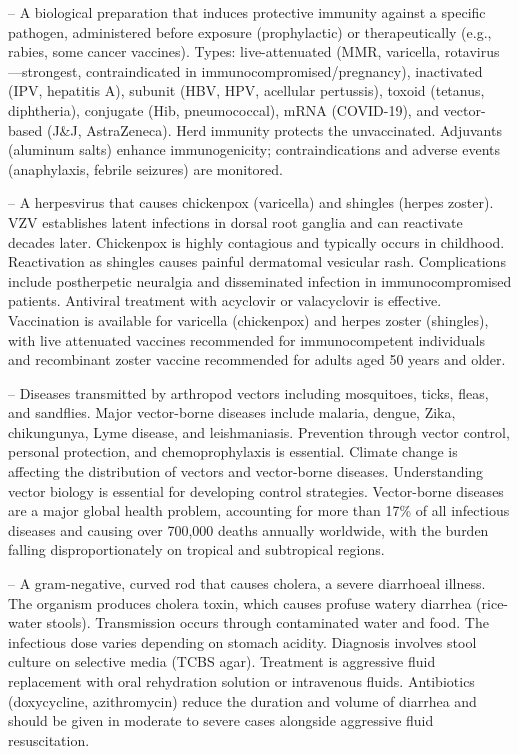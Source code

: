 -- A biological preparation that induces protective immunity against a specific pathogen, administered before exposure (prophylactic) or therapeutically (e.g., rabies, some cancer vaccines). Types: live-attenuated (MMR, varicella, rotavirus—strongest, contraindicated in immunocompromised/pregnancy), inactivated (IPV, hepatitis A), subunit (HBV, HPV, acellular pertussis), toxoid (tetanus, diphtheria), conjugate (Hib, pneumococcal), mRNA (COVID-19), and vector-based (J\&J, AstraZeneca). Herd immunity protects the unvaccinated. Adjuvants (aluminum salts) enhance immunogenicity; contraindications and adverse events (anaphylaxis, febrile seizures) are monitored.

-- A herpesvirus that causes chickenpox (varicella) and shingles (herpes zoster). VZV establishes latent infections in dorsal root ganglia and can reactivate decades later. Chickenpox is highly contagious and typically occurs in childhood. Reactivation as shingles causes painful dermatomal vesicular rash. Complications include postherpetic neuralgia and disseminated infection in immunocompromised patients. Antiviral treatment with acyclovir or valacyclovir is effective. Vaccination is available for varicella (chickenpox) and herpes zoster (shingles), with live attenuated vaccines recommended for immunocompetent individuals and recombinant zoster vaccine recommended for adults aged 50 years and older.

-- Diseases transmitted by arthropod vectors including mosquitoes, ticks, fleas, and sandflies. Major vector-borne diseases include malaria, dengue, Zika, chikungunya, Lyme disease, and leishmaniasis. Prevention through vector control, personal protection, and chemoprophylaxis is essential. Climate change is affecting the distribution of vectors and vector-borne diseases. Understanding vector biology is essential for developing control strategies. Vector-borne diseases are a major global health problem, accounting for more than 17\% of all infectious diseases and causing over 700,000 deaths annually worldwide, with the burden falling disproportionately on tropical and subtropical regions.

-- A gram-negative, curved rod that causes cholera, a severe diarrhoeal illness. The organism produces cholera toxin, which causes profuse watery diarrhea (rice-water stools). Transmission occurs through contaminated water and food. The infectious dose varies depending on stomach acidity. Diagnosis involves stool culture on selective media (TCBS agar). Treatment is aggressive fluid replacement with oral rehydration solution or intravenous fluids. Antibiotics (doxycycline, azithromycin) reduce the duration and volume of diarrhea and should be given in moderate to severe cases alongside aggressive fluid resuscitation.

